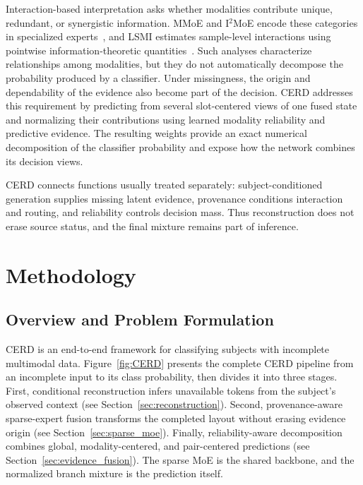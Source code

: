 \documentclass[a4paper,fleqn]{cas-dc}
\begin{document}
Interaction-based interpretation asks whether modalities contribute unique, redundant, or synergistic information. MMoE and I$^2$MoE encode these categories in specialized experts~\cite{yu2024mmoe,xin2025i2moe}, and LSMI estimates sample-level interactions using pointwise information-theoretic quantities~\cite{yang2025lsmi}. Such analyses characterize relationships among modalities, but they do not automatically decompose the probability produced by a classifier. Under missingness, the origin and dependability of the evidence also become part of the decision. CERD addresses this requirement by predicting from several slot-centered views of one fused state and normalizing their contributions using learned modality reliability and predictive evidence. The resulting weights provide an exact numerical decomposition of the classifier probability and expose how the network combines its decision views.

CERD connects functions usually treated separately: subject-conditioned generation supplies missing latent evidence, provenance conditions interaction and routing, and reliability controls decision mass. Thus reconstruction does not erase source status, and the final mixture remains part of inference.


\section{Methodology}
\label{sec:method}

\subsection{Overview and Problem Formulation}
\label{sec:method_overview}

CERD is an end-to-end framework for classifying subjects with incomplete multimodal data. Figure~\ref{fig:CERD} presents the complete CERD pipeline from an incomplete input to its class probability, then divides it into three stages. First, conditional reconstruction infers unavailable tokens from the subject's observed context (see Section~\ref{sec:reconstruction}). Second, provenance-aware sparse-expert fusion transforms the completed layout without erasing evidence origin (see Section~\ref{sec:sparse_moe}). Finally, reliability-aware decomposition combines global, modality-centered, and pair-centered predictions (see Section~\ref{sec:evidence_fusion}). The sparse MoE is the shared backbone, and the normalized branch mixture is the prediction itself.
\end{document}
